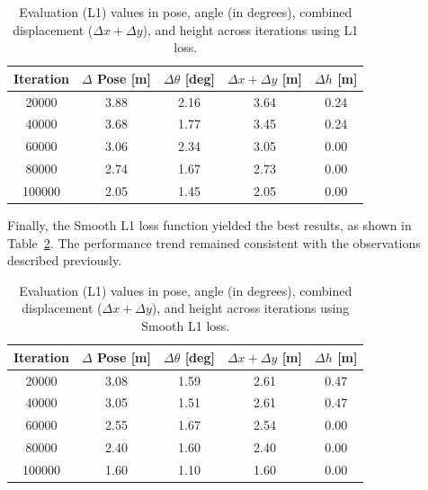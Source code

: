 \begin{table}[H]
    \centering
    \renewcommand{\arraystretch}{1.2} 
    \setlength{\tabcolsep}{10pt}
    \begin{tabular}{c c c c c}
        \toprule
        \textbf{Iteration} & \textbf{$\Delta$ Pose [m]} & \textbf{$\Delta \theta$ [deg]} & \textbf{$\Delta x + \Delta y$ [m]} & \textbf{$\Delta h$ [m]} \\
        \midrule
        \num{20000}  & 3.88 & 2.16  & 3.64 & 0.24 \\
        \num{40000}  & 3.68 & 1.77  & 3.45 & 0.24 \\
        \num{60000}  & 3.06 & 2.34  & 3.05 & 0.00 \\
        \num{80000}  & 2.74 & 1.67  & 2.73 & 0.00 \\
        \num{100000} & 2.05 & 1.45  & 2.05 & 0.00 \\
        \bottomrule
    \end{tabular}
    \caption{Evaluation (L1) values in pose, angle (in degrees), combined displacement ($\Delta x + \Delta y$), and height across iterations using L1 loss.}
    \label{tab:pose_variations_deg_l1}
\end{table}

Finally, the Smooth L1 loss function yielded the best results, as shown in Table~\ref{tab:pose_variations_deg_l1s}. The performance trend remained consistent with the observations described previously.

\begin{table}[H]
    \centering
    \renewcommand{\arraystretch}{1.2} 
    \setlength{\tabcolsep}{10pt} 
    \begin{tabular}{c c c c c}
        \toprule
        \textbf{Iteration} & \textbf{$\Delta$ Pose [m]} & \textbf{$\Delta \theta$ [deg]} & \textbf{$\Delta x + \Delta y$ [m]} & \textbf{$\Delta h$ [m]} \\
        \midrule
        \num{20000}  & 3.08 & 1.59  & 2.61 & 0.47 \\
        \num{40000}  & 3.05 & 1.51  & 2.61 & 0.47 \\
        \num{60000}  & 2.55 & 1.67  & 2.54 & 0.00 \\
        \num{80000}  & 2.40 & 1.60  & 2.40 & 0.00 \\
        \num{100000} & 1.60 & 1.10  & 1.60 & 0.00 \\
        \bottomrule
    \end{tabular}
    \caption{Evaluation (L1) values in pose, angle (in degrees), combined displacement ($\Delta x + \Delta y$), and height across iterations using Smooth L1 loss.}
    \label{tab:pose_variations_deg_l1s}
\end{table}



